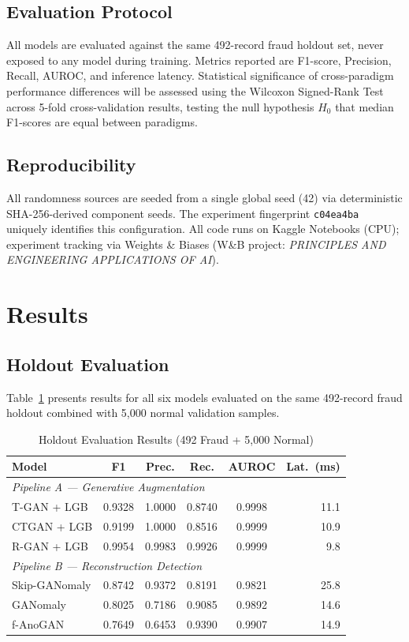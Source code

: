\documentclass[conference]{IEEEtran}
\begin{document}
\subsection{Evaluation Protocol}

All models are evaluated against the same 492-record fraud holdout set,
never exposed to any model during training. Metrics reported are F1-score,
Precision, Recall, AUROC, and inference latency. Statistical significance
of cross-paradigm performance differences will be assessed using the
Wilcoxon Signed-Rank Test across 5-fold cross-validation results, testing
the null hypothesis $H_0$ that median F1-scores are equal between paradigms.

\subsection{Reproducibility}

All randomness sources are seeded from a single global seed (42) via
deterministic SHA-256-derived component seeds. The experiment fingerprint
\texttt{c04ea4ba} uniquely identifies this configuration. All code runs
on Kaggle Notebooks (CPU); experiment tracking via Weights \& Biases
(W\&B project: \textit{PRINCIPLES AND ENGINEERING APPLICATIONS OF AI}).

\section{Results}

\subsection{Holdout Evaluation}

Table~\ref{tab:results} presents results for all six models evaluated on
the same 492-record fraud holdout combined with 5,000 normal validation
samples.

\begin{table}[htbp]
\caption{Holdout Evaluation Results (492 Fraud + 5,000 Normal)}
\label{tab:results}
\centering
\begin{tabular}{lccccr}
\toprule
\textbf{Model} & \textbf{F1} & \textbf{Prec.} & \textbf{Rec.}
               & \textbf{AUROC} & \textbf{Lat.\ (ms)} \\
\midrule
\multicolumn{6}{l}{\textit{Pipeline A — Generative Augmentation}} \\
T-GAN + LGB   & 0.9328 & 1.0000 & 0.8740 & 0.9998 & 11.1 \\
CTGAN + LGB   & 0.9199 & 1.0000 & 0.8516 & 0.9999 & 10.9 \\
R-GAN + LGB   & 0.9954 & 0.9983 & 0.9926 & 0.9999 &  9.8 \\
\midrule
\multicolumn{6}{l}{\textit{Pipeline B — Reconstruction Detection}} \\
Skip-GANomaly & 0.8742 & 0.9372 & 0.8191 & 0.9821 & 25.8 \\
GANomaly      & 0.8025 & 0.7186 & 0.9085 & 0.9892 & 14.6 \\
f-AnoGAN      & 0.7649 & 0.6453 & 0.9390 & 0.9907 & 14.9 \\
\bottomrule
\end{tabular}
\end{table}
\end{document}
